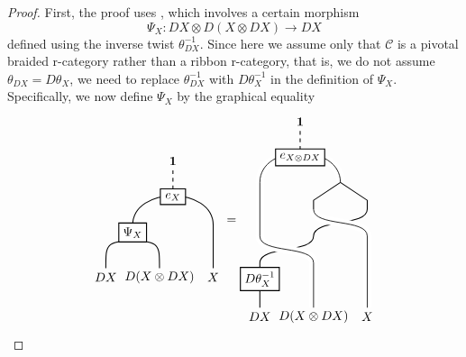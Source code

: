 \documentclass[11pt, reqno]{amsart}
\theoremstyle{definition}\newtheorem{defi}[thm]{Definition}
\theoremstyle{definition}\newtheorem{rem}[thm]{Remark}
\theoremstyle{definition}\newtheorem{exam}[thm]{Example}
\theoremstyle{definition}\newtheorem{assum}[thm]{Assumption}
\newcommand{\cC}{\mathcal{C}}
\newcommand{\tens}{\otimes}
\newcommand{\vac}{\mathbf{1}}
\begin{document}
\begin{proof}
First, the proof uses \cite[Lemma 3.3]{McR}, which involves a certain morphism
\begin{equation*}
\Psi_X: DX\otimes D(X\otimes DX)\longrightarrow DX
\end{equation*}
defined using the inverse twist $\theta_{DX}^{-1}$. Since here we assume only that $\cC$ is a pivotal braided r-category rather than a ribbon r-category, that is, we do not assume $\theta_{DX}= D\theta_X$, we need to replace $\theta_{DX}^{-1}$ with $D\theta_X^{-1}$ in the definition of $\Psi_X$. Specifically, we now define $\Psi_X$ by the graphical equality
\begin{equation*}
  \begin{matrix}
     \begin{tikzpicture}[scale = 1, baseline = {(current bounding box.center)}, line width=0.75pt]
     \draw (1.5,1) .. controls (1.5,1.7) .. (.75,1.8);
     \draw (0,1) .. controls (0,1.7) .. (.75,1.8);
     \draw (.75,2.2) .. controls (.75,3.3) and (3,3.3) .. (3,2.2) -- (3,1);
     \draw[dashed] (1.875,3) -- (1.875,3.8);
    \node at (0,.75) {$DX$};
    \node at (3,.75) {$X$};
    \node at (1.875,4) {$\vac$};
    \node at (1.5,.75) {$D(X\tens DX)$};
    \node at (.75,2) [draw,minimum width=20pt,minimum height=10pt,thick, fill=white] {$\Psi_X$};
    \node at (1.875,3) [draw,minimum width=20pt,minimum height=10pt,thick, fill=white] {$e_X$};   
     \end{tikzpicture}
   \end{matrix}   = 
   \begin{matrix}
    \begin{tikzpicture}[scale = 1, baseline = {(current bounding box.center)}, line width=0.75pt]
    \draw (0,0) -- (0,1);
     \draw (0,1) -- (0,1.25) .. controls (0, 1.75) and (1.5, 1.5) .. (1.5, 2) .. controls (1.5, 2.5) and (3, 2.25) .. (3,2.75);
     \draw[white, double=black, line width = 3pt ] (1.5,0) -- (1.5,1.25) .. controls (1.5, 1.75) and (0,1.5) .. (0,2) -- (0,3.5) .. controls (0,4.6) and (2.25,4.6) .. (2.25,3.5); 
    \draw[white, double=black, line width = 3pt ] (3,0) -- (3,2) .. controls (3,2.5) and (1.5,2.25) .. (1.5,2.75);
    \draw (1.5,2.75) -- (1.5, 3) -- (2.25, 3.5);
    \draw (2.25,3.5) -- (3,3) -- (3,2.75);
    \draw[dashed] (1.125, 4.2) -- (1.125,5);
    \node at (0,-.25) {$DX$};
    \node at (3,-.25) {$X$};
    \node at (1.125,5.2) {$\vac$};
    \node at (1.5,-.25) {$D(X\tens DX)$};
    \node at (0,.8) [draw,minimum width=20pt,minimum height=10pt,thick, fill=white] {$D\theta_{X}^{-1}$};
    \node at (1.125,4.2) [draw,minimum width=20pt,minimum height=10pt,thick, fill=white] {$e_{X\otimes DX}$};

\end{tikzpicture}
\end{matrix}
\end{equation*}
\end{proof}
\end{document}
